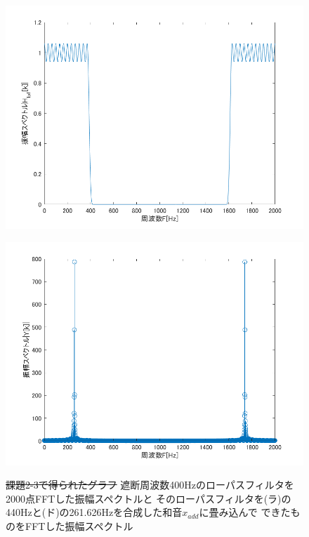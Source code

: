 \documentclass[11pt, a4paper, titlepage]{ltjsarticle}
\begin{document}
\begin{figure}[h]
    \begin{center}
    \begin{minipage}[t]{0.48\columnwidth}
        \includegraphics[width=\columnwidth]{figures/2-3lpf.png}
        \label{fign:2-3lpf}
    \end{minipage}
    \begin{minipage}[t]{0.48\columnwidth}
        \includegraphics[width=\columnwidth]{figures/2-3y.png}
        \label{fign:2-3y}
    \end{minipage}
    \end{center}
    \caption{\sout{課題2-3で得られたグラフ}
    遮断周波数400Hzのローパスフィルタを2000点FFTした振幅スペクトルと
    そのローパスフィルタを(ラ)の440Hzと(ド)の261.626Hzを合成した和音$x_{add}$に畳み込んで
    できたものをFFTした振幅スペクトル}
\end{figure}
\end{document}
